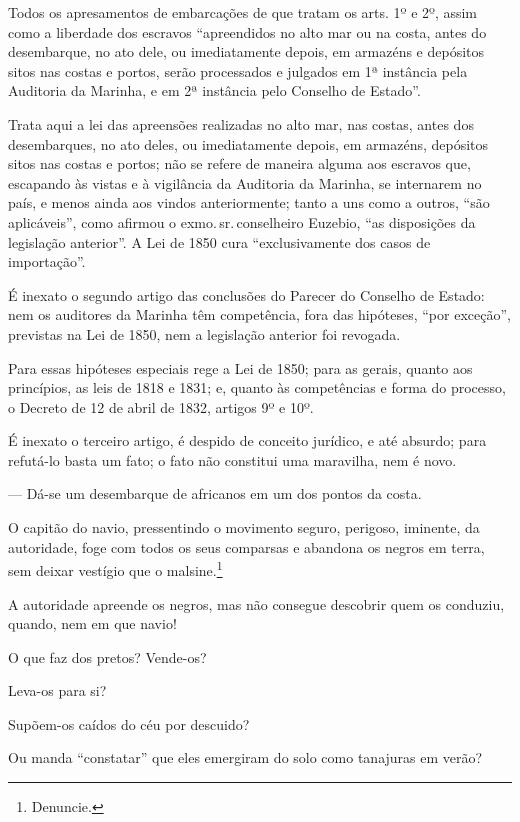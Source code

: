 Todos os apresamentos de embarcações de que tratam os arts. 1º e 2º,
assim como a liberdade dos escravos ``apreendidos no alto mar ou na
costa, antes do desembarque, no ato dele, ou imediatamente depois, em
armazéns e depósitos sitos nas costas e portos, serão processados e
julgados em 1ª instância pela Auditoria da Marinha, e em 2ª
instância pelo Conselho de Estado''.

Trata aqui a lei das apreensões realizadas no alto mar, nas costas,
antes dos desembarques, no ato deles, ou imediatamente depois, em
armazéns, depósitos sitos nas costas e portos; não se refere de maneira
alguma aos escravos que, escapando às vistas e à vigilância da Auditoria
da Marinha, se internarem no país, e menos ainda aos vindos
anteriormente; tanto a uns como a outros, ``são aplicáveis'', como afirmou
o exmo.\,sr.\,conselheiro Euzebio, ``as disposições da legislação
anterior''. A Lei de 1850 cura ``exclusivamente dos casos de importação''.

É inexato o segundo artigo das conclusões do Parecer do Conselho de
Estado: nem os auditores da Marinha têm competência, fora das hipóteses,
``por exceção'', previstas na Lei de 1850, nem a legislação anterior foi
revogada.

Para essas hipóteses especiais rege a Lei de 1850; para as gerais,
quanto aos princípios, as leis de 1818 e 1831; e, quanto às competências
e forma do processo, o Decreto de 12 de abril de 1832, artigos 9º
e 10º.

É inexato o terceiro artigo, é despido de conceito jurídico, e até
absurdo; para refutá-lo basta um fato; o fato não constitui uma
maravilha, nem é novo.

--- Dá-se um desembarque de africanos em um dos pontos da costa.

O capitão do navio, pressentindo o movimento seguro, perigoso, iminente,
da autoridade, foge com todos os seus comparsas e abandona os negros em
terra, sem deixar vestígio que o malsine.\footnote{Denuncie.}

A autoridade apreende os negros, mas não consegue descobrir quem os
conduziu, quando, nem em que navio!

O que faz dos pretos? Vende-os?

Leva-os para si?

Supõem-os caídos do céu por descuido?

Ou manda ``constatar'' que eles emergiram do solo como tanajuras em verão?

